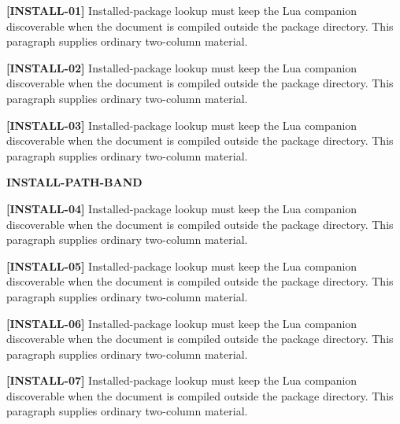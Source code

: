 \documentclass[twocolumn]{article}
\newcommand\Par[1]{\par\textbf{[#1]} Installed-package lookup must keep the
  Lua companion discoverable when the document is compiled outside the package
  directory. This paragraph supplies ordinary two-column material.\par\medskip}
\begin{document}
\Par{INSTALL-01}\Par{INSTALL-02}\Par{INSTALL-03}
\begin{wideband}
  \centering\textbf{INSTALL-PATH-BAND}
\end{wideband}
\Par{INSTALL-04}\Par{INSTALL-05}\Par{INSTALL-06}\Par{INSTALL-07}
\end{document}
